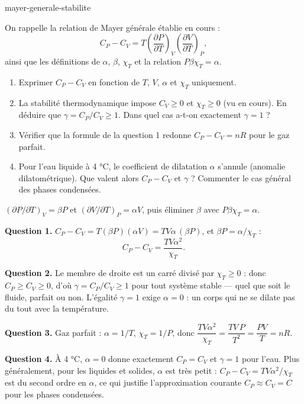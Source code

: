 \begin{exo}{mayer-generale-stabilite}

On rappelle la relation de Mayer générale établie en cours :
\[
C_P - C_V = T\left(\frac{\partial P}{\partial T}\right)_V\left(\frac{\partial V}{\partial T}\right)_P,
\]
ainsi que les définitions de $\alpha$, $\beta$, $\chi_T$ et la relation $P\beta\chi_T = \alpha$.

\begin{enumerate}
\item Exprimer $C_P - C_V$ en fonction de $T$, $V$, $\alpha$ et $\chi_T$ uniquement.
\item La stabilité thermodynamique impose $C_V \geq 0$ et $\chi_T \geq 0$ (vu en cours). En déduire que $\gamma = C_P/C_V \geq 1$. Dans quel cas a-t-on exactement $\gamma = 1$ ?
\item Vérifier que la formule de la question 1 redonne $C_P - C_V = nR$ pour le gaz parfait.
\item Pour l'eau liquide à 4 °C, le coefficient de dilatation $\alpha$ s'annule (anomalie dilatométrique). Que valent alors $C_P - C_V$ et $\gamma$ ? Commenter le cas général des phases condensées.
\end{enumerate}

\begin{indication}
$\left(\partial P/\partial T\right)_V = \beta P$ et $\left(\partial V/\partial T\right)_P = \alpha V$, puis éliminer $\beta$ avec $P\beta\chi_T = \alpha$.
\end{indication}

\begin{solution}
\textbf{Question 1.} $C_P - C_V = T(\beta P)(\alpha V) = TV\alpha\,(\beta P)$, et $\beta P = \alpha/\chi_T$ :
\[
\boxed{C_P - C_V = \frac{TV\alpha^2}{\chi_T}}.
\]

\textbf{Question 2.} Le membre de droite est un carré divisé par $\chi_T \geq 0$ : donc $C_P \geq C_V \geq 0$, d'où $\gamma = C_P/C_V \geq 1$ pour tout système stable — quel que soit le fluide, parfait ou non. L'égalité $\gamma = 1$ exige $\alpha = 0$ : un corps qui ne se dilate pas du tout avec la température.

\textbf{Question 3.} Gaz parfait : $\alpha = 1/T$, $\chi_T = 1/P$, donc $\dfrac{TV\alpha^2}{\chi_T} = \dfrac{TV\,P}{T^2} = \dfrac{PV}{T} = nR$. \checkmark

\textbf{Question 4.} À 4 °C, $\alpha = 0$ donne exactement $C_P = C_V$ et $\gamma = 1$ pour l'eau. Plus généralement, pour les liquides et solides, $\alpha$ est très petit : $C_P - C_V = TV\alpha^2/\chi_T$ est du second ordre en $\alpha$, ce qui justifie l'approximation courante $C_P \approx C_V = C$ pour les phases condensées.
\end{solution}
\end{exo}

